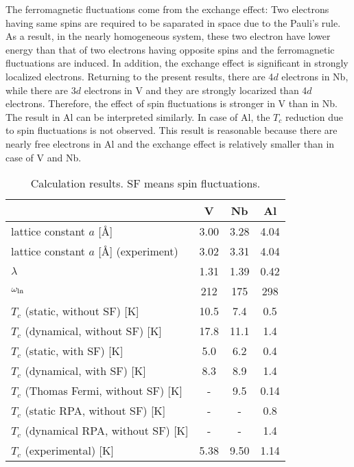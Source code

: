 The ferromagnetic fluctuations come from the exchange effect: Two electrons having same spins are 
required to be saparated in space due to the Pauli's rule. As a result, in the 
nearly homogeneous system, these two electron have lower energy than that of two electrons having 
opposite spins and the ferromagnetic fluctuations are induced.
In addition, the exchange effect is significant in strongly localized electrons.
Returning to the present results, there are 4$d$ electrons in Nb, while there are 3$d$ electrons 
in V and they are strongly locarized than 4$d$ electrons. Therefore, the effect of spin fluctuations
is stronger in V than in Nb.
The result in Al can be interpreted similarly. In case of Al, the $T_c$ reduction due to spin fluctuations
is not observed. This result is reasonable because there are nearly free electrons in Al and the
exchange effect is relatively smaller than in case of V and Nb.
%
\begin{table}[htbp]
	\centering
	\caption{Calculation results. SF means spin fluctuations.} 
	\begin{tabular}{lccc}
		\hline \hline
		& V & Nb & Al \\
		\hline
		lattice constant $a$ [\AA] & 3.00 & 3.28 & 4.04 \\
		lattice constant $a$ [\AA] (experiment) & 3.02\cite{Kuentzler1985} & 3.31\cite{Laesser1985} & 4.04\cite{Sumiyama1990} \\
		\hline
		$\lambda$ & 1.31 & 1.39 & 0.42 \\
		$\omega_{\rm ln}$ & 212 & 175 & 298 \\
		\hline
		$T_c$ (static, without SF) [K] & 10.5 & 7.4 & 0.5 \\
		$T_c$ (dynamical, without SF) [K] & 17.8 & 11.1 & 1.4 \\
		$T_c$ (static, with SF) [K] & 5.0 & 6.2 & 0.4 \\
		$T_c$ (dynamical, with SF) [K] & 8.3 & 8.9 & 1.4 \\
		$T_c$ (Thomas Fermi, without SF) [K] & - & 9.5\cite{Luders2005} & 0.14\cite{Luders2005} \\
		$T_c$ (static RPA, without SF) [K] & - & - & 0.8\cite{RA2013} \\
		$T_c$ (dynamical RPA, without SF) [K] & - & - & 1.4\cite{RA2013} \\
		$T_c$ (experimental)\cite{Ashcroft} [K] & 5.38 & 9.50 & 1.14 \\
		\hline \hline
	\end{tabular}
	\label{tab:results}
\end{table}

